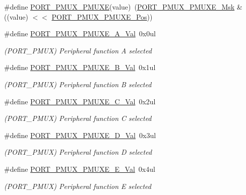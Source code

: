 \begin{DoxyCompactItemize}
\item 
\#define \mbox{\hyperlink{group___s_a_m_d21___p_o_r_t_ga1a0548ef99b601e76ee01c5de4b8f32b}{P\+O\+R\+T\+\_\+\+P\+M\+U\+X\+\_\+\+P\+M\+U\+XE}}(value)~(\mbox{\hyperlink{group___s_a_m_d21___p_o_r_t_gae955cb77e730b16d702cd0fcdb156ec4}{P\+O\+R\+T\+\_\+\+P\+M\+U\+X\+\_\+\+P\+M\+U\+X\+E\+\_\+\+Msk}} \& ((value) $<$$<$ \mbox{\hyperlink{group___s_a_m_d21___p_o_r_t_ga38a4c4871ecabeb4ad36398b73685bac}{P\+O\+R\+T\+\_\+\+P\+M\+U\+X\+\_\+\+P\+M\+U\+X\+E\+\_\+\+Pos}}))
\item 
\#define \mbox{\hyperlink{group___s_a_m_d21___p_o_r_t_gac2904834a0243c812025b5da13235658}{P\+O\+R\+T\+\_\+\+P\+M\+U\+X\+\_\+\+P\+M\+U\+X\+E\+\_\+\+A\+\_\+\+Val}}~0x0ul
\begin{DoxyCompactList}\small\item\em (P\+O\+R\+T\+\_\+\+P\+M\+UX) Peripheral function A selected \end{DoxyCompactList}\item 
\#define \mbox{\hyperlink{group___s_a_m_d21___p_o_r_t_gad247fef8f025e05eca4c88968a7c4ba3}{P\+O\+R\+T\+\_\+\+P\+M\+U\+X\+\_\+\+P\+M\+U\+X\+E\+\_\+\+B\+\_\+\+Val}}~0x1ul
\begin{DoxyCompactList}\small\item\em (P\+O\+R\+T\+\_\+\+P\+M\+UX) Peripheral function B selected \end{DoxyCompactList}\item 
\#define \mbox{\hyperlink{group___s_a_m_d21___p_o_r_t_gab47780ac1a22bc26130c2d72803aaf4a}{P\+O\+R\+T\+\_\+\+P\+M\+U\+X\+\_\+\+P\+M\+U\+X\+E\+\_\+\+C\+\_\+\+Val}}~0x2ul
\begin{DoxyCompactList}\small\item\em (P\+O\+R\+T\+\_\+\+P\+M\+UX) Peripheral function C selected \end{DoxyCompactList}\item 
\#define \mbox{\hyperlink{group___s_a_m_d21___p_o_r_t_ga934efa06dffb41353e14a0d649351797}{P\+O\+R\+T\+\_\+\+P\+M\+U\+X\+\_\+\+P\+M\+U\+X\+E\+\_\+\+D\+\_\+\+Val}}~0x3ul
\begin{DoxyCompactList}\small\item\em (P\+O\+R\+T\+\_\+\+P\+M\+UX) Peripheral function D selected \end{DoxyCompactList}\item 
\#define \mbox{\hyperlink{group___s_a_m_d21___p_o_r_t_gaea30c71f5bc91714c57780b5ff2b2211}{P\+O\+R\+T\+\_\+\+P\+M\+U\+X\+\_\+\+P\+M\+U\+X\+E\+\_\+\+E\+\_\+\+Val}}~0x4ul
\begin{DoxyCompactList}\small\item\em (P\+O\+R\+T\+\_\+\+P\+M\+UX) Peripheral function E selected \end{DoxyCompactList}\item 
$$
\end{DoxyCompactItemize}
